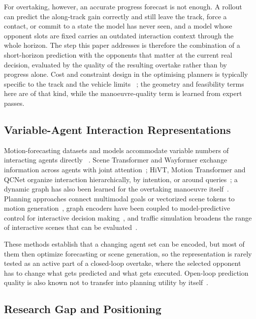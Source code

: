 \documentclass[journal]{IEEEtran}
\begin{document}
For overtaking, however, an accurate progress forecast is not enough. A rollout
can predict the along-track gain correctly and still leave the track, force a
contact, or commit to a state the model has never seen, and a model whose
opponent slots are fixed carries an outdated interaction context through the
whole horizon. The step this paper addresses is therefore the combination of a
short-horizon prediction with the opponents that matter at the current real
decision, evaluated by the quality of the resulting overtake rather than by
progress alone. Cost and constraint design in the optimising planners is
typically specific to the track and the vehicle limits
~\cite{betz2023tum,jung2023kaist,cheng2024chassis_trajectory}; the geometry and
feasibility terms here are of that kind, while the manoeuvre-quality term is
learned from expert passes.

\subsection{Variable-Agent Interaction Representations}

Motion-forecasting datasets and models accommodate variable numbers of
interacting agents directly
~\cite{ettinger2021womd,wilson2023argoverse2}. Scene Transformer and Wayformer
exchange information across agents with joint
attention~\cite{ngiam2021scene,nayakanti2023wayformer}; HiVT, Motion Transformer
and QCNet organize interaction hierarchically, by intention, or around
queries~\cite{zhou2022hivt,shi2022mtr,zhou2023qcnet}; a dynamic graph has also
been learned for the overtaking manoeuvre itself~\cite{hu2023dynamicgraph}.
Planning approaches
connect multimodal goals or vectorized scene tokens to motion
generation~\cite{gu2021densetnt,jiang2023vad}, graph encoders have been coupled
to model-predictive control for interactive
decision making~\cite{yang2025gnnmpc}, and traffic simulation
broadens the range of interactive scenes that can be
evaluated~\cite{sun2022intersim,feng2023trafficgen,gulino2023waymax}.

These methods establish that a changing agent set can be encoded, but most of
them then optimize forecasting or scene generation, so the representation is
rarely tested as an active part of a closed-loop overtake, where the selected
opponent has to change what gets predicted and what gets executed. Open-loop
prediction quality is also known not to transfer into planning utility by
itself~\cite{caesar2021nuplan,shi2025motionforecasting}.

\subsection{Research Gap and Positioning}
\end{document}
